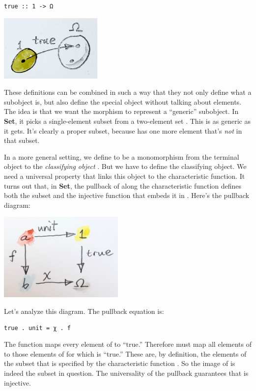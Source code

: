 \begin{verbatim}
true :: 1 -> Ω
\end{verbatim}

\includegraphics[width=1.97917in]{images/true.jpg}

These definitions can be combined in such a way that they not only
define what a subobject is, but also define the special object
 without talking about elements. The idea is that we want the
morphism  to represent a ``generic'' subobject. In
\textbf{Set}, it picks a single-element subset from a two-element set
. This is as generic as it gets. It's clearly a proper subset,
because  has one more element that's \emph{not} in that
subset.

In a more general setting, we define  to be a monomorphism
from the terminal object to the \emph{classifying object} .
But we have to define the classifying object. We need a universal
property that links this object to the characteristic function. It turns
out that, in \textbf{Set}, the pullback of  along the
characteristic function  defines both the subset 
and the injective function that embeds it in . Here's the
pullback diagram:

\includegraphics[width=2.41667in]{images/pullback.jpg}

Let's analyze this diagram. The pullback equation is:

\begin{verbatim}
true . unit = χ . f
\end{verbatim}

The function  maps every element of  to
``true.'' Therefore  must map all elements of  to
those elements of  for which  is ``true.'' These
are, by definition, the elements of the subset that is specified by the
characteristic function . So the image of  is indeed
the subset in question. The universality of the pullback guarantees that
 is injective.


